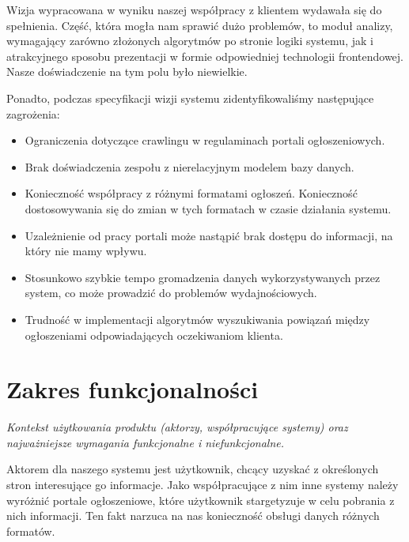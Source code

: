 \documentclass[polish,12pt]{aghthesis}
\begin{document}
Wizja wypracowana w wyniku naszej współpracy z klientem wydawała się do spełnienia.
Część, która mogła nam sprawić dużo problemów, to moduł analizy, wymagający
zarówno złożonych algorytmów po stronie logiki systemu, jak i atrakcyjnego
sposobu prezentacji w formie odpowiedniej technologii frontendowej. Nasze 
doświadczenie na tym polu było niewielkie.

Ponadto, podczas specyfikacji wizji systemu zidentyfikowaliśmy następujące zagrożenia:
\begin{itemize}

\item Ograniczenia dotyczące crawlingu w regulaminach portali ogłoszeniowych.
\item Brak doświadczenia zespołu z nierelacyjnym modelem bazy danych.
\item Konieczność współpracy z różnymi formatami ogłoszeń. Konieczność dostosowywania się do zmian w tych formatach w czasie działania systemu.
\item Uzależnienie od pracy portali może nastąpić brak dostępu do informacji, na który nie mamy wpływu.
\item Stosunkowo szybkie tempo gromadzenia danych wykorzystywanych przez system, co może prowadzić do problemów wydajnościowych.
\item Trudność w implementacji algorytmów wyszukiwania powiązań między ogłoszeniami odpowiadających oczekiwaniom klienta.
\end{itemize}

\section{Zakres funkcjonalności}
\label{sec:zakres-funkcjonalnosci}

\emph{Kontekst użytkowania produktu (aktorzy, współpracujące systemy)
  oraz najważniejsze wymagania funkcjonalne i niefunkcjonalne.}

Aktorem dla naszego systemu jest użytkownik, chcący uzyskać z określonych stron interesujące go informacje.
Jako współpracujące z nim inne systemy należy wyróżnić portale ogłoszeniowe, które użytkownik stargetyzuje
w celu pobrania z nich informacji. Ten fakt narzuca na nas konieczność obsługi danych różnych formatów.
\end{document}
